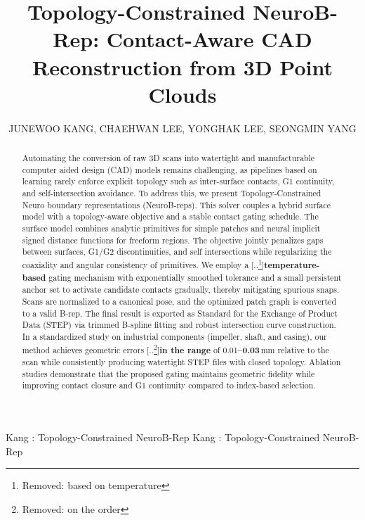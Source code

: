 \documentclass{ieeeaccess}
\providecommand{\DIFaddtex}[1]{{\color{blue}\bfseries #1}} %
\providecommand{\DIFdeltex}[1]{{\color{red}[..\footnote{\color{black}Removed: #1}]}} %
\providecommand{\DIFaddbegin}{} %
\providecommand{\DIFaddend}{} %
\providecommand{\DIFdelbegin}{} %
\providecommand{\DIFdelend}{} %
\providecommand{\DIFadd}[1]{\texorpdfstring{\DIFaddtex{#1}}{#1}} %
\providecommand{\DIFdel}[1]{\texorpdfstring{\DIFdeltex{#1}}{}} %
\begin{document}

\title{Topology-Constrained NeuroB-Rep: Contact-Aware CAD Reconstruction from 3D Point Clouds}

\author{
\uppercase{JuneWoo Kang},
\uppercase{ChaeHwan Lee},
\uppercase{YongHak Lee},
\uppercase{SeongMin Yang}
}

\address[1]{Department of Computer Information Engineering, Kwangwoon University, Seoul 01897, Korea}
\address[2]{Department of Data Science, Konkuk University, Seoul 05029, Korea}
\address[3]{Department of Applied Statistics, Konkuk University, Seoul 05029, Korea}


\markboth
{Kang \headeretal: Topology-Constrained NeuroB-Rep}
{Kang \headeretal: Topology-Constrained NeuroB-Rep}


\begin{abstract} 
Automating the conversion of raw 3D scans into watertight and manufacturable computer aided design (CAD) models remains challenging, as pipelines based on learning rarely enforce explicit topology such as inter-surface contacts, G1 continuity, and self-intersection avoidance. To address this, we present Topology-Constrained Neuro boundary representations (NeuroB-reps). This solver couples a hybrid surface model with a topology-aware objective and a stable contact gating schedule. The surface model combines analytic primitives for simple patches and neural implicit signed distance functions for freeform regions. The objective jointly penalizes gaps between surfaces, G1/G2 discontinuities, and self intersections while regularizing the coaxiality and angular consistency of primitives. We employ a \DIFdelbegin \DIFdel{based on temperature }\DIFdelend \DIFaddbegin \DIFadd{temperature-based }\DIFaddend gating mechanism with exponentially smoothed tolerance and a small persistent anchor set to activate candidate contacts gradually, thereby mitigating spurious snaps. Scans are normalized to a canonical pose, and the optimized patch graph is converted to a valid B-rep. The final result is exported as Standard for the Exchange of Product Data (STEP) via trimmed B-spline fitting and robust intersection curve construction. In a standardized study on industrial components (impeller, shaft, and casing), our method achieves geometric errors \DIFdelbegin \DIFdel{on the order }\DIFdelend \DIFaddbegin \DIFadd{in the range }\DIFaddend of 0.01\DIFaddbegin \DIFadd{--0.03\,}\DIFaddend mm relative to the scan while consistently producing watertight STEP files with closed topology. Ablation studies demonstrate that the proposed gating maintains geometric fidelity while improving contact closure and G1 continuity compared to index-based selection.  
\end{abstract}
\end{document}
